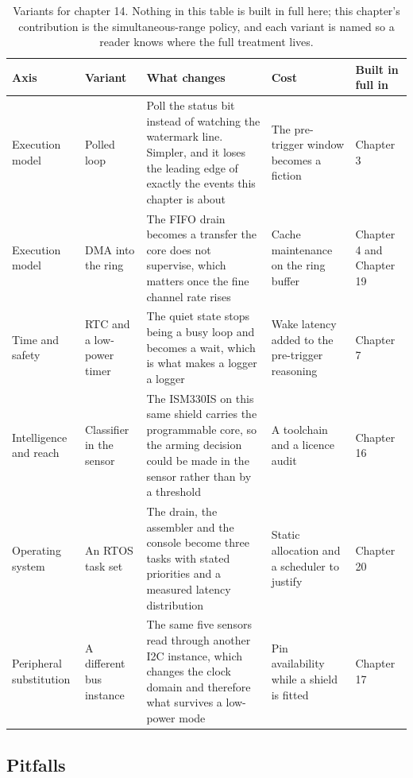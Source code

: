 \begin{table}[H]\centering\small
\begin{tabular}{p{24mm}p{26mm}p{44mm}p{22mm}p{20mm}}
\toprule
Axis & Variant & What changes & Cost & Built in full in \\
\midrule
Execution model & Polled loop & Poll the status bit instead of watching the watermark line. Simpler, and it loses the leading edge of exactly the events this chapter is about & The pre-trigger window becomes a fiction & Chapter 3 \\
Execution model & DMA into the ring & The FIFO drain becomes a transfer the core does not supervise, which matters once the fine channel rate rises & Cache maintenance on the ring buffer & Chapter 4 and Chapter 19 \\
Time and safety & RTC and a low-power timer & The quiet state stops being a busy loop and becomes a wait, which is what makes a logger a logger & Wake latency added to the pre-trigger reasoning & Chapter 7 \\
Intelligence and reach & Classifier in the sensor & The ISM330IS on this same shield carries the programmable core, so the arming decision could be made in the sensor rather than by a threshold & A toolchain and a licence audit & Chapter 16 \\
Operating system & An RTOS task set & The drain, the assembler and the console become three tasks with stated priorities and a measured latency distribution & Static allocation and a scheduler to justify & Chapter 20 \\
Peripheral substitution & A different bus instance & The same five sensors read through another I2C instance, which changes the clock domain and therefore what survives a low-power mode & Pin availability while a shield is fitted & Chapter 17 \\
\bottomrule
\end{tabular}
\caption{Variants for chapter 14. Nothing in this table is built in full here; this chapter's contribution is the simultaneous-range policy, and each variant is named so a reader knows where the full treatment lives.}
\end{table}

\subsection*{Pitfalls}

